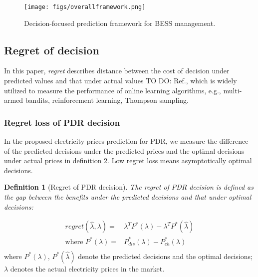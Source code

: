 \documentclass[journal]{IEEEtran}
\newtheorem{definition}{Definition}
\newcommand{\slw}{\color{blue}}
\begin{document}
\begin{figure}[ht]
  \centering
  \texttt{[image: figs/overallframework.png]}
  \caption{Decision-focused prediction framework for BESS management.}
  \label{transforming}
\end{figure}


\subsection{Regret of decision}
In this paper, \textit{regret} describes distance between the cost of decision under predicted values and that under actual values \cite{Sutton2018} {\slw TO DO: Ref.}, which is widely utilized to measure the performance of online learning algorithms, e.g., multi-armed bandits, reinforcement learning, Thompson sampling.

\subsubsection{Regret loss of PDR decision}
In the proposed electricity prices prediction for PDR, we measure the difference of the predicted decisions under the predicted prices and the optimal decisions under actual prices in definition 2. Low regret loss means asymptotically optimal decisions.
\begin{definition}[Regret of PDR decision]
The regret of PDR decision is defined as the gap between the benefits under the predicted decisions and that under optimal decisions:  
\end{definition}
\begin{equation}
  \label{gradientsofregret}
  \begin{aligned}
    regret(\hat{\lambda}, \lambda) = & \lambda^T P^*(\lambda) - \lambda^T P^*(\hat{\lambda}) \\
    \text{where } P^*(\lambda) = & P_{dis}^*(\lambda) - P_{ch}^*(\lambda)  \\
  \end{aligned}
\end{equation}
where $ P^*(\lambda)$, $ P^*(\hat{\lambda})$ denote the predicted decisions and the optimal decisions; $\lambda$ denotes the actual electricity prices in the market.
\end{document}
